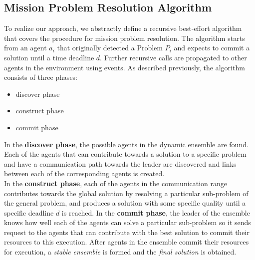 \documentclass[journal]{IEEEtran}
\theoremstyle{definition}
\begin{document}
\subsection{Mission Problem Resolution Algorithm}









To realize our approach, we abstractly define a recursive best-effort algorithm that covers the procedure for mission problem resolution.
The algorithm starts from an agent $a_i$ that originally detected a Problem $P_i$ and expects to commit a solution until a time deadline $d$.
Further recursive calls are propagated to other agents in the environment using events.
As described  previously, the algorithm consists of three phases:
\begin{itemize}
\item discover phase 
\item construct phase
\item commit phase
\end{itemize}
 In the \textbf{discover phase}, the possible agents in the dynamic ensemble are found. Each of the agents that can contribute towards a solution to a specific problem and have a communication path towards 
 the leader are discovered and links between each of the corresponding agents is created. \\
 In the \textbf{construct phase}, each of the agents in the communication range contributes towards the global solution by resolving a particular sub-problem of the general problem, and produces a solution with some specific quality until a specific deadline $d$ is reached.
 In the \textbf{commit phase}, the leader of the ensemble knows how well each of the agents can solve a particular sub-problem so it sends request to the agents that can contribute with the best solution to commit their resources to this execution. After agents in the ensemble commit their resources for execution, a \textit{stable ensemble} is formed and the \textit{final solution} is obtained.
 
\end{document}
